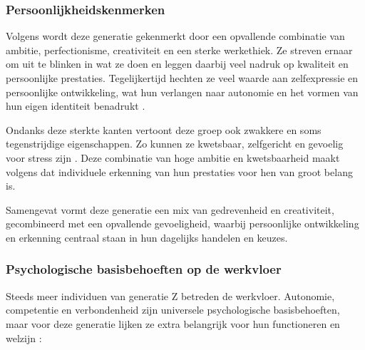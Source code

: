 \vspace{1em}

\subsubsection{Persoonlijkheidskenmerken}
\label{subsubsec:perskenmerken-z}

\vspace{1em}

Volgens \textcite{Cnossen2024} wordt deze generatie gekenmerkt door een opvallende combinatie van ambitie, perfectionisme, creativiteit en een sterke werkethiek. Ze streven ernaar om uit te blinken in wat ze doen en leggen daarbij veel nadruk op kwaliteit en persoonlijke prestaties. Tegelijkertijd hechten ze veel waarde aan zelfexpressie en persoonlijke ontwikkeling, wat hun verlangen naar autonomie en het vormen van hun eigen identiteit benadrukt \autocite{Zahra2025}.

\vspace{1em}

Ondanks deze sterkte kanten vertoont deze groep ook zwakkere en soms tegenstrijdige eigenschappen. Zo kunnen ze kwetsbaar, zelfgericht en gevoelig voor stress zijn \autocite{Cnossen2024}. Deze combinatie van hoge ambitie en kwetsbaarheid maakt volgens \textcite{Zahra2025} dat individuele erkenning van hun prestaties voor hen van groot belang is.

\vspace{1em}

Samengevat vormt deze generatie een mix van gedrevenheid en creativiteit, gecombineerd met een opvallende gevoeligheid, waarbij persoonlijke ontwikkeling en erkenning centraal staan in hun dagelijks handelen en keuzes.

\vspace{1em}

\subsubsection{Psychologische basisbehoeften op de werkvloer}
\label{subsubsec:psychbehoeften-z}

\vspace{1em}

Steeds meer individuen van generatie Z betreden de werkvloer. Autonomie, competentie en verbondenheid zijn universele psychologische basisbehoeften, maar voor deze generatie lijken ze extra belangrijk voor hun functioneren en welzijn \autocite{Cnossen2024}:

